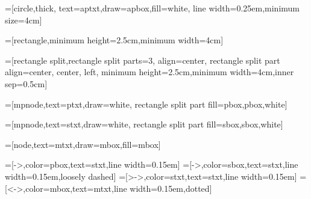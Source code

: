 




=[circle,thick,
	text=aptxt,draw=apbox,fill=white,
	line width=0.25em,minimum size=4cm]

=[rectangle,minimum height=2.5cm,minimum width=4cm]

=[rectangle split,rectangle split parts=3,
	align=center,
	rectangle split part align={center, center, left},
	minimum height=2.5cm,minimum width=4cm,inner sep=0.5cm]

=[mpnode,text=ptxt,draw=white,
  	rectangle split part fill={pbox,pbox,white}]

=[mpnode,text=stxt,draw=white,
	rectangle split part fill={sbox,sbox,white}]

=[node,text=mtxt,draw=mbox,fill=mbox]

=[->,color=pbox,text=stxt,line width=0.15em]
=[->,color=sbox,text=stxt,line width=0.15em,loosely dashed]
=[>->,color=stxt,text=stxt,line width=0.15em]
=[<->,color=mbox,text=mtxt,line width=0.15em,dotted]
